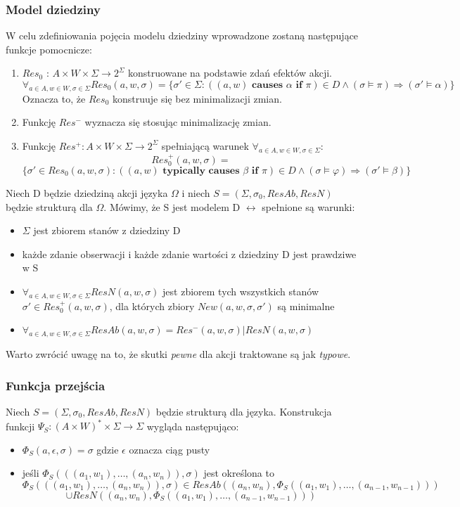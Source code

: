 \documentclass{article}
\begin{document}
\subsubsection{Model dziedziny}
W celu zdefiniowania pojęcia modelu dziedziny wprowadzone zostaną następujące funkcje pomocnicze:
\begin{enumerate}
	\item $Res_{0}$ : $A \times W \times \Sigma \to 2^{\Sigma}$ konstruowane na podstawie zdań efektów akcji.
	\[ \forall_{a \in A, w \in W, \sigma \in \Sigma} Res_{0}(a,w,\sigma) = \{\sigma' \in \Sigma: ((a, w) \textbf{ causes } \alpha \textbf{ if } \pi) \in D \land (\sigma \models \pi) \Rightarrow (\sigma' \models \alpha) \}  \]
	Oznacza to, że $Res_{0}$ konstruuje się bez minimalizacji zmian.
	\item Funkcję $Res^{-}$ wyznacza się stosując minimalizację zmian.
	\item Funkcję $Res^{+} : A \times W \times \Sigma \to 2^{\Sigma}$ spełniającą warunek $\forall_{a \in A, w \in W, \sigma \in \Sigma}$:
	\[ Res_{0}^{+}(a, w,\sigma) = \]
	\[ \{\sigma' \in Res_{0}(a, w,\sigma) : ((a, w) \textbf{ typically causes } \beta \textbf{ if } \pi) \in D \land (\sigma \models \varphi) \Rightarrow (\sigma' \models \beta) \}  \]
\end{enumerate}

Niech D będzie dziedziną akcji języka $\Omega$ i niech $S=(\Sigma, \sigma_{0}, ResAb, ResN)$ będzie strukturą dla $\Omega$. Mówimy, że S jest modelem D $\leftrightarrow$ spełnione są warunki:
\begin{itemize}
	\item $\Sigma$ jest zbiorem stanów z dziedziny D
	\item każde zdanie obserwacji i każde zdanie wartości z dziedziny D jest prawdziwe w S
	\item $\forall_{ a \in A, w \in W, \sigma \in \Sigma } ResN(a, w, \sigma)$ jest zbiorem tych wszystkich stanów $\sigma' \in Res_{0}^{+}(a, w, \sigma)$, dla których zbiory $New(a, w, \sigma, \sigma')$ są minimalne
	\item $\forall_{a \in A, w \in W, \sigma \in \Sigma} ResAb(a, w, \sigma) = Res^{-}(a, w, \sigma) | ResN(a, w, \sigma)$
\end{itemize}
Warto zwrócić uwagę na to, że skutki \textit{pewne} dla akcji traktowane są jak \textit{typowe}.

\subsubsection{Funkcja przejścia}
Niech $S=(\Sigma,\sigma_{0},ResAb,ResN)$ będzie strukturą dla języka. Konstrukcja funkcji $\Psi_{S} : (A \times W)^{*} \times \Sigma \to \Sigma$ wygląda następująco:
\begin{itemize}
	\item $\Phi_{S}(a,\epsilon,\sigma)=\sigma$ gdzie $\epsilon$ oznacza ciąg pusty
	\item jeśli $\Phi_{S}(((a_{1}, w_{1}), \dots, (a_{n}, w_{n})),\sigma)$ jest określona to
	\[\Phi_{S}(((a_{1}, w_{1}), \dots, (a_{n}, w_{n})),\sigma) \in ResAb((a_{n}, w_{n}), \Phi_{S}((a_{1}, w_{1}),\dots,(a_{n-1}, w_{n-1}))) \]
	\[ \cup ResN((a_{n}, w_{n}), \Phi_{S}((a_{1}, w_{1}),\dots,(a_{n-1}, w_{n-1})))\]
\end{itemize}
\end{document}
